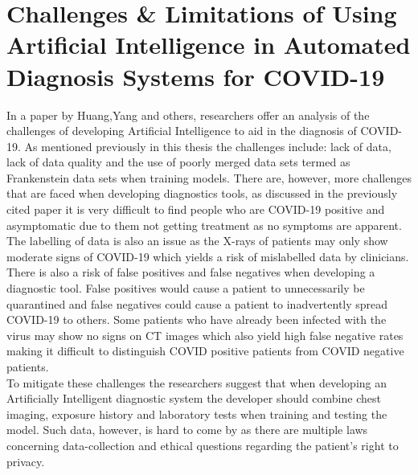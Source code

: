 \section{Challenges \& Limitations of Using Artificial Intelligence in Automated Diagnosis Systems for COVID-19}
In a paper by Huang,Yang and others, researchers offer an analysis of the challenges of developing Artificial Intelligence to aid in the diagnosis of COVID-19.  As mentioned previously in this thesis the challenges include: lack of data, lack of data quality and the use of poorly merged data sets termed as Frankenstein data sets when training models. There are, however, more challenges that are faced when developing diagnostics tools, as discussed in the previously cited paper\cite{litReviewCnnLstm} it is very difficult to find people who are COVID-19 positive and asymptomatic due to them not getting treatment as no symptoms are apparent.  The labelling of data is also an issue as the X-rays of patients may only show moderate signs of COVID-19 which yields a risk of mislabelled data by clinicians.  There is also a risk of false positives and false negatives when developing a diagnostic tool.  False positives would cause a patient to unnecessarily be quarantined and false negatives could cause a patient to inadvertently spread COVID-19 to others.  Some patients who have already been infected with the virus may show no signs on CT images which also yield high false negative rates making it difficult to distinguish COVID positive patients from COVID negative patients.  
\\
To mitigate these challenges the researchers suggest that when developing an Artificially Intelligent diagnostic system the developer should combine chest imaging, exposure history and laboratory tests when training and testing the model.  Such data, however, is hard to come by as there are multiple laws concerning data-collection and ethical questions regarding the patient's right to privacy.   
